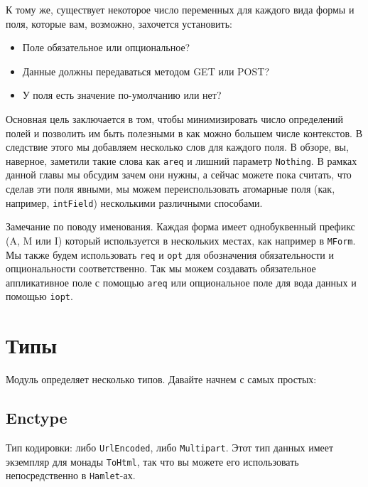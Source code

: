 К тому же, существует некоторое число переменных для каждого вида формы и поля,
которые вам, возможно, захочется установить:
\begin{itemize}
\item Поле обязательное или опциональное?
\item Данные должны передаваться методом GET или POST?
\item У поля есть значение по-умолчанию или нет?
\end{itemize}

Основная цель заключается в том, чтобы минимизировать число определений полей и позволить
им быть полезными в как можно большем числе контекстов. В следствие этого мы добавляем
несколько слов для каждого поля. В обзоре, вы, наверное, заметили такие слова как
\lstinline'areq' и лишний параметр \lstinline'Nothing'. В рамках данной главы мы обсудим 
зачем они нужны, а сейчас можете пока считать, что сделав эти поля явными, мы можем
переиспользовать атомарные поля (как, например, 
{\lstinline'intField'}) несколькими различными способами.

Замечание по поводу именования. Каждая форма имеет однобуквенный префикс (A, M или I)
который используется в нескольких местах, как например в \lstinline'MForm'. Мы также
будем использовать \lstinline'req' и \lstinline'opt' для обозначения обязательности и
опциональности соответственно. Так мы можем создавать обязательное аппликативное поле с
помощью \lstinline'areq' или опциональное поле для вода данных и помощью \lstinline'iopt'.

\section{Типы}

Модуль  
определяет несколько типов. Давайте начнем с самых простых:

\subsection{Enctype}
Тип кодировки: либо \lstinline'UrlEncoded', либо \lstinline'Multipart'. Этот тип данных
имеет экземпляр для монады \lstinline'ToHtml', так что вы можете его использовать
непосредственно в \lstinline'Hamlet'-ах.

